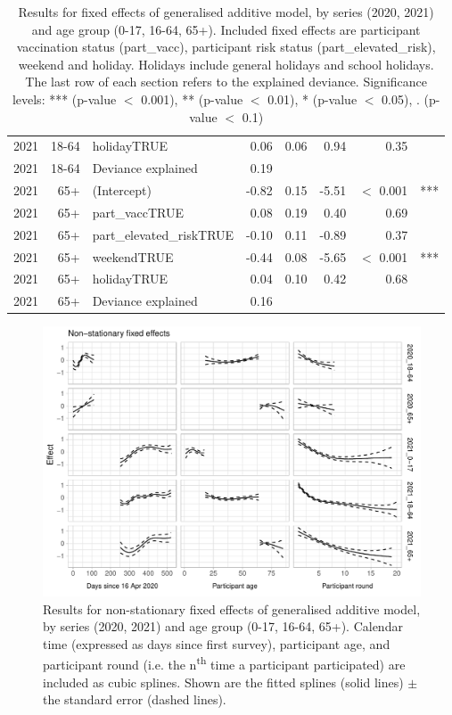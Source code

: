 \documentclass[fleqn,10pt]{wlscirep}
\begin{document}
\begin{table}[ht]
\begin{tabular}{rrlrrrrl}
  2021 & 18-64 & holidayTRUE & 0.06 & 0.06 & 0.94 & 0.35 &  \\ 
  2021 & 18-64 & Deviance explained & 0.19 &  &  &  &  \\ 
  \hline
  2021 & 65+ & (Intercept) & -0.82 & 0.15 & -5.51 & $<$ 0.001 & *** \\ 
  2021 & 65+ & part\_vaccTRUE & 0.08 & 0.19 & 0.40 & 0.69 &  \\ 
  2021 & 65+ & part\_elevated\_riskTRUE & -0.10 & 0.11 & -0.89 & 0.37 &  \\ 
  2021 & 65+ & weekendTRUE & -0.44 & 0.08 & -5.65 & $<$ 0.001 & *** \\ 
  2021 & 65+ & holidayTRUE & 0.04 & 0.10 & 0.42 & 0.68 &  \\ 
  2021 & 65+ & Deviance explained & 0.16 &  &  &  &  \\ 
   \hline
\end{tabular}
\caption{\label{tab:fixed_effects}Results for fixed effects of generalised additive model, by series (2020, 2021) and age group (0-17, 16-64, 65+). Included fixed effects are participant vaccination status (part\_vacc), participant risk status (part\_elevated\_risk), weekend and holiday. Holidays include general holidays and school holidays. The last row of each section refers to the explained deviance.
Significance levels: *** (p-value $<$ 0.001), ** (p-value $<$ 0.01), * (p-value $<$ 0.05), . (p-value $<$ 0.1) } 
\end{table}


\begin{figure}[ht]
\centering
\includegraphics[width=\linewidth]{../figures/results_splines.pdf}
\caption{Results for non-stationary fixed effects of generalised additive model, by series (2020, 2021) and age group (0-17, 16-64, 65+). Calendar time (expressed as days since first survey), participant age, and participant round (i.e. the n\textsuperscript{th} time a participant participated) are included as cubic splines. Shown are the fitted splines (solid lines) $\pm$ the standard error (dashed lines).}
\label{fig:splines}
\end{figure}
\end{document}
